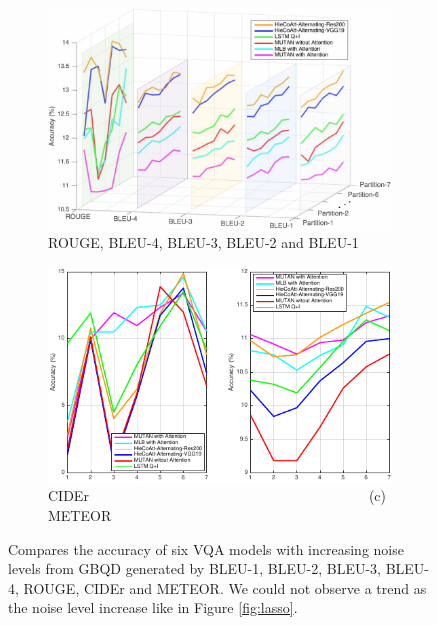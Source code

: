 \documentclass[letterpaper]{article}
\begin{document}
\begin{figure}
	\begin{subfigure}[t]{0.49\linewidth}
		\includegraphics{ROUGE_and_BLEU_GBQD}
		\caption{ROUGE, BLEU-4, BLEU-3, BLEU-2 and BLEU-1}
	\end{subfigure}
	\hfill
	\begin{subfigure}[t]{0.49\linewidth}
		\includegraphics{METEOR_and_CIDEr_GBQD}
		\caption{CIDEr~~~~~~~~~~~~~~~~~~~~~~~~~~~~~~~~~~~~~~~~(c) METEOR}
	\end{subfigure}
	\caption{Compares the accuracy of six VQA models with increasing noise levels from GBQD generated by BLEU-1, BLEU-2, BLEU-3, BLEU-4, ROUGE, CIDEr and METEOR. We could not observe a trend as the noise level increase like in Figure \ref{fig:lasso}.}
	\label{fig:others_gbqd}
\end{figure}
\end{document}

